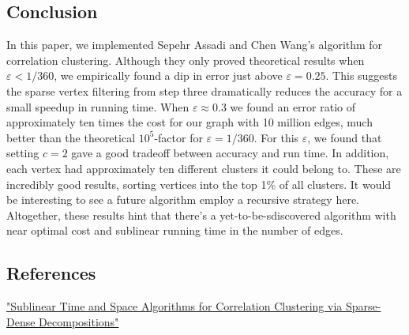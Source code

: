 \documentclass[
]{article}
\begin{document}
\hypertarget{conclusion}{%
  \subsection{Conclusion}\label{conclusion}}

In this paper, we implemented Sepehr Assadi and Chen
Wang's algorithm for correlation clustering. Although they only proved theoretical results when $\varepsilon < 1/360$, we empirically found a dip in error just above $\varepsilon = 0.25$. This suggests the sparse vertex filtering from step three dramatically reduces the accuracy for a small speedup in running time. When $\varepsilon\approx 0.3$ we found an error ratio of approximately ten times the cost for our graph with 10 million edges, much better than the theoretical $10^5$-factor for $\varepsilon = 1/360$. For this $\varepsilon$, we found that setting $c = 2$ gave a good tradeoff between accuracy and run time. In addition, each vertex had approximately ten different clusters it could belong to. These are incredibly good results, sorting vertices into the top 1\% of all clusters. It would be interesting to see a future algorithm employ a recursive strategy here. Altogether, these results hint that there's a yet-to-be-sdiscovered algorithm with near optimal cost and sublinear running time in the number of edges.

\hypertarget{references}{%
  \subsection{References}\label{references}}

\href{https://doi.org/10.48550/arxiv.2109.14528}{"Sublinear Time and
  Space Algorithms for Correlation Clustering via Sparse-Dense
  Decompositions"}
\end{document}
